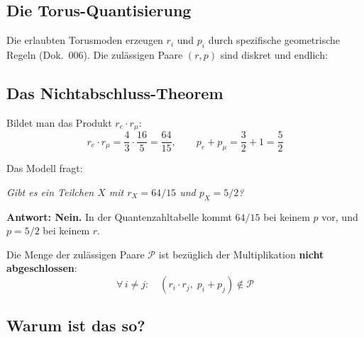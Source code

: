 \subsection{Die Torus-Quantisierung}

Die erlaubten Torusmoden erzeugen $r_i$ und $p_i$ durch spezifische
geometrische Regeln (Dok.~006). Die zulässigen Paare $(r,p)$
sind diskret und endlich:

\begin{center}
{\footnotesize
{}
}
\end{center}

\subsection{Das Nichtabschluss-Theorem}

Bildet man das Produkt $r_e \cdot r_\mu$:
\[
  r_e \cdot r_\mu = \frac{4}{3} \cdot \frac{16}{5} = \frac{64}{15},
  \qquad p_e + p_\mu = \frac{3}{2} + 1 = \frac{5}{2}
\]

Das Modell fragt:
\begin{center}
  \emph{Gibt es ein Teilchen $X$ mit $r_X = 64/15$ und $p_X = 5/2$?}
\end{center}

\textbf{Antwort: Nein.} In der Quantenzahltabelle kommt $64/15$ bei
keinem $p$ vor, und $p=5/2$ bei keinem $r$.

Die Menge der zulässigen Paare $\mathcal{P}$ ist bezüglich der
Multiplikation \textbf{nicht abgeschlossen}:
\begin{equation}
  \forall\, i \neq j:\quad (r_i \cdot r_j,\; p_i + p_j) \notin \mathcal{P}
  \label{eq:nichtabschluss}
\end{equation}

\subsection{Warum ist das so?}

